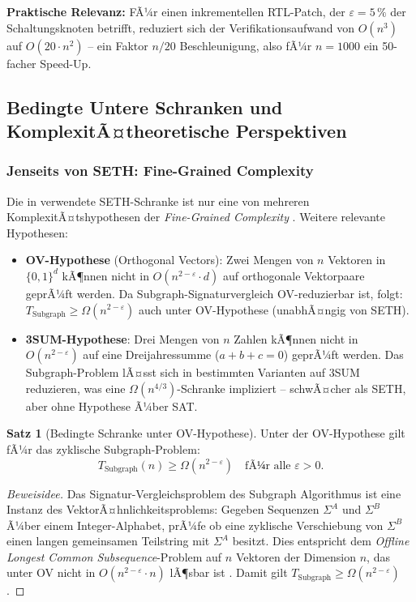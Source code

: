 ﻿\documentclass[a4paper,12pt]{article}
\theoremstyle{definition}
\newtheorem{satz}{Satz}
\begin{document}
\textbf{Praktische Relevanz:} FÃ¼r einen inkrementellen RTL-Patch, der $\varepsilon = 5\,\%$
der Schaltungsknoten betrifft, reduziert sich der Verifikationsaufwand von $O(n^3)$
auf $O(20 \cdot n^2)$ -- ein Faktor $n/20$ Beschleunigung, also fÃ¼r $n = 1000$ ein
50-facher Speed-Up.

\subsection{Bedingte Untere Schranken und KomplexitÃ¤theoretische Perspektiven}

\subsubsection{Jenseits von SETH: Fine-Grained Complexity}

Die in \cite{subgraph2026} verwendete SETH-Schranke ist nur eine von mehreren
KomplexitÃ¤tshypothesen der \emph{Fine-Grained Complexity} \cite{vassilevska2018hardness}.
Weitere relevante Hypothesen:

\begin{itemize}
  \item \textbf{OV-Hypothese} (Orthogonal Vectors): Zwei Mengen von $n$ Vektoren in
        $\{0,1\}^d$ kÃ¶nnen nicht in $O(n^{2-\varepsilon} \cdot d)$ auf orthogonale
        Vektorpaare geprÃ¼ft werden. Da Subgraph-Signaturvergleich OV-reduzierbar ist,
        folgt: $T_{\text{Subgraph}} \geq \Omega(n^{2-\varepsilon})$ auch unter OV-Hypothese
        (unabhÃ¤ngig von SETH).
  \item \textbf{3SUM-Hypothese}: Drei Mengen von $n$ Zahlen kÃ¶nnen nicht in $O(n^{2-\varepsilon})$
        auf eine Dreijahressumme ($a+b+c=0$) geprÃ¼ft werden. Das Subgraph-Problem lÃ¤sst
        sich in bestimmten Varianten auf 3SUM reduzieren, was eine $\Omega(n^{4/3})$-Schranke
        impliziert -- schwÃ¤cher als SETH, aber ohne Hypothese Ã¼ber SAT.
\end{itemize}

\begin{satz}[Bedingte Schranke unter OV-Hypothese]\label{satz:ov_schranke}
  Unter der OV-Hypothese gilt fÃ¼r das zyklische Subgraph-Problem:
  \[
    T_{\text{Subgraph}}(n) \geq \Omega(n^{2-\varepsilon}) \quad \text{fÃ¼r alle } \varepsilon > 0.
  \]
\end{satz}

\begin{proof}[Beweisidee]
  Das Signatur-Vergleichsproblem des Subgraph Algorithmus ist eine Instanz des
  VektorÃ¤hnlichkeitsproblems: Gegeben Sequenzen $\Sigma^A$ und $\Sigma^B$ Ã¼ber
  einem Integer-Alphabet, prÃ¼fe ob eine zyklische Verschiebung von $\Sigma^B$ einen
  langen gemeinsamen Teilstring mit $\Sigma^A$ besitzt. Dies entspricht dem
  \emph{Offline Longest Common Subsequence}-Problem auf $n$ Vektoren der Dimension $n$,
  das unter OV nicht in $O(n^{2-\varepsilon} \cdot n)$ lÃ¶sbar ist
  \cite{abboud2014consequences}. Damit gilt $T_{\text{Subgraph}} \geq \Omega(n^{2-\varepsilon})$.
\end{proof}
\end{document}
